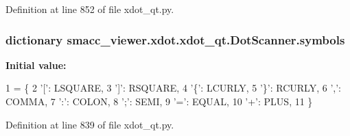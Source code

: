 Definition at line 852 of file xdot\+\_\+qt.\+py.

\subsubsection[{\texorpdfstring{symbols}{symbols}}]{\setlength{\rightskip}{0pt plus 5cm}dictionary smacc\+\_\+viewer.\+xdot.\+xdot\+\_\+qt.\+Dot\+Scanner.\+symbols\hspace{0.3cm}{\ttfamily [static]}}\hypertarget{classsmacc__viewer_1_1xdot_1_1xdot__qt_1_1DotScanner_ab465e4646fec3fb737e596e422e067b8}{}\label{classsmacc__viewer_1_1xdot_1_1xdot__qt_1_1DotScanner_ab465e4646fec3fb737e596e422e067b8}
{\bfseries Initial value\+:}
\begin{DoxyCode}
1 = \{
2         \textcolor{stringliteral}{'['}: LSQUARE,
3         \textcolor{stringliteral}{']'}: RSQUARE,
4         \textcolor{stringliteral}{'\{'}: LCURLY,
5         \textcolor{stringliteral}{'\}'}: RCURLY,
6         \textcolor{stringliteral}{','}: COMMA,
7         \textcolor{stringliteral}{':'}: COLON,
8         \textcolor{stringliteral}{';'}: SEMI,
9         \textcolor{stringliteral}{'='}: EQUAL,
10         \textcolor{stringliteral}{'+'}: PLUS,
11     \}
\end{DoxyCode}


Definition at line 839 of file xdot\+\_\+qt.\+py.

